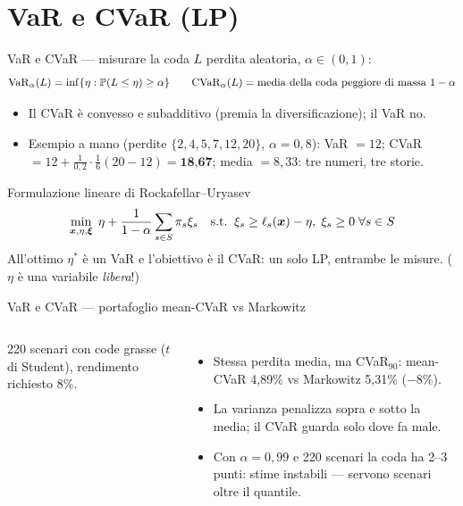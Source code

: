 \documentclass[11pt,aspectratio=169]{beamer}
\begin{document}
\section{VaR e CVaR (LP)}

\begin{frame}{VaR e CVaR --- misurare la coda}
$L$ perdita aleatoria, $\alpha \in (0,1)$:
\[
\mathrm{VaR}_\alpha(L) = \inf\{\eta : \mathbb{P}(L \le \eta) \ge \alpha\}
\qquad
\mathrm{CVaR}_\alpha(L) = \text{media della coda peggiore di massa } 1 - \alpha
\]
\begin{itemize}
  \item Il CVaR è \alert{convesso} e subadditivo (premia la diversificazione);
        il VaR no.
  \item Esempio a mano (perdite $\{2,4,5,7,12,20\}$, $\alpha = 0{,}8$):
        VaR $= 12$; CVaR $= 12 + \frac{1}{0{,}2}\cdot\frac{1}{6}(20 - 12) =
        \textbf{18,67}$; media $= 8{,}33$: tre numeri, tre storie.
\end{itemize}
\begin{block}{Formulazione lineare di Rockafellar--Uryasev}
\vspace{-1ex}
\[
\min_{\boldsymbol{x}, \eta, \boldsymbol{\xi}}\; \eta + \frac{1}{1 - \alpha}\sum_{s \in S} \pi_s \xi_s
\quad\text{s.t.}\;\; \xi_s \ge \ell_s(\boldsymbol{x}) - \eta,\; \xi_s \ge 0 \;\forall s \in S
\]
All'ottimo $\eta^*$ è un VaR e l'obiettivo è il CVaR: \alert{un solo LP}, entrambe
le misure. ($\eta$ è una variabile \emph{libera}!)
\end{block}
\end{frame}

\begin{frame}{VaR e CVaR --- portafoglio mean-CVaR vs Markowitz}
\begin{columns}
\small
220 scenari con \alert{code grasse} ($t$ di Student), rendimento richiesto 8\%.
\begin{itemize}
  \item Stessa perdita media, ma CVaR$_{90}$: mean-CVaR 4,89\% vs Markowitz 5,31\%
        ($-8\%$).
  \item La varianza penalizza sopra e sotto la media; il CVaR guarda \alert{solo
        dove fa male}.
  \item Con $\alpha = 0{,}99$ e 220 scenari la coda ha 2--3 punti: stime instabili
        --- servono scenari oltre il quantile.
\end{itemize}
\end{columns}
\end{frame}
\end{document}
